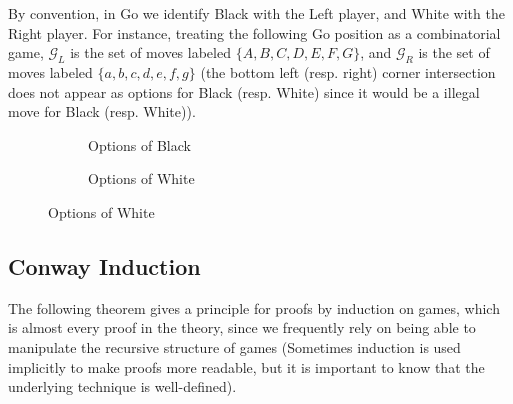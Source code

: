 \documentclass[../math194_paper.tex]{subfiles}
\begin{document}
By convention, in Go we identify Black with the Left player, and White with the Right player. 
For instance, treating the following Go position as a combinatorial game, 
$\mathcal{G}_L$ is the set of moves labeled $\{A, B, C, D, E, F,G \}$, and 
$\mathcal{G}_R$ is the set of moves labeled $\{a,b,c,d,e,f,g\}$
(the bottom left (resp. right) corner intersection does not appear as options for Black (resp. White) since 
it would be a illegal move for Black (resp. White)).

\begin{figure}[H]
\centering 
\begin{subfigure}[b]{0.45\linewidth}
\centering

\begin{psgoboard*}[4]
\end{psgoboard*}

\caption{Options of Black}

\end{subfigure}
\quad
\begin{subfigure}[b]{0.45\linewidth}
\centering

\begin{psgoboard*}[4]
\end{psgoboard*}

\caption{Options of White}

\end{subfigure}

\end{figure}

\subsection{Conway Induction}

The following theorem gives a principle for proofs by induction on games, which 
is almost every proof in the theory, since we frequently rely on being able 
to manipulate the recursive structure of games (Sometimes induction is used implicitly 
to make proofs more readable, but it is important to know that the underlying technique 
is well-defined).
\end{document}
